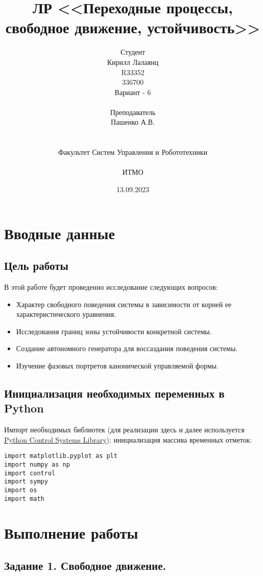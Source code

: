 \documentclass[16pt]{article}
\title{ЛР \textnumero 2 <<Переходные процессы, свободное движение, устойчивость>>}
\author{
Студент \\
Кирилл Лалаянц\\
R33352\\
336700\\
Вариант - 6\\
\\
Преподаватель\\
Пашенко А.В. \\
\\
\\
Факультет Систем Управления и Робототехники\\
\\
ИТМО\\
}
\date{13.09.2023}
\begin{document}
\maketitle
\newpage
\tableofcontents
\thispagestyle{empty}

\newpage
\setcounter{page}{1}
\section{Вводные данные}
\subsection{Цель работы}
В этой работе будет проведенно исследование следующих вопросов:
\begin{itemize}
    \item Характер свободного поведения системы в зависимости от корней ее характеристического уравнения. 
    \item Исследования границ зоны устойчивости конкретной системы. 
    \item Создание автономного генератора для воссаздания поведения системы. 
    \item Изучение фазовых портретов канонической управляемой формы.
\end{itemize} 

\subsection{Инициализация необходимых переменных в Python}
Импорт необходимых библиотек (для реализации здесь и далее используется \href{https://python-control.readthedocs.io}{Python Control Systems Library}); инициализация массива временных отметок:
\begin{verbatim}
import matplotlib.pyplot as plt
import numpy as np
import control 
import sympy
import os
import math
\end{verbatim}

\newpage
\section{Выполнение работы}
\label{sec:headings}


\subsection{Задание 1. Свободное движение.}
\end{document}
